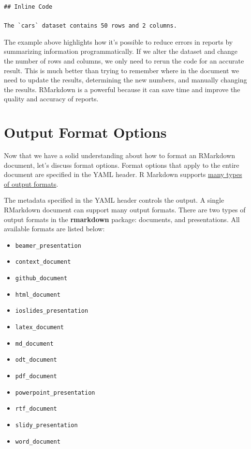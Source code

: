 \documentclass[
]{book}
\begin{document}
\begin{verbatim}
## Inline Code

The `cars` dataset contains 50 rows and 2 columns.
\end{verbatim}

The example above highlights how it's possible to reduce errors in reports by summarizing information programmatically. If we alter the dataset and change the number of rows and columns, we only need to rerun the code for an accurate result. This is much better than trying to remember where in the document we need to update the results, determining the new numbers, and manually changing the results. RMarkdown is a powerful because it can save time and improve the quality and accuracy of reports.

\hypertarget{output-format-options}{%
\section{Output Format Options}\label{output-format-options}}

Now that we have a solid understanding about how to format an RMarkdown document, let's discuss format options. Format options that apply to the entire document are specified in the YAML header. R Markdown supports \href{https://rmarkdown.rstudio.com/authoring_quick_tour.html\#Output_Formats}{many types of output formats}.

The metadata specified in the YAML header controls the output. A single RMarkdown document can support many output formats. There are two types of output formats in the \textbf{rmarkdown} package: documents, and presentations. All available formats are listed below:

\begin{itemize}
\item
  \texttt{beamer\_presentation}
\item
  \texttt{context\_document}
\item
  \texttt{github\_document}
\item
  \texttt{html\_document}
\item
  \texttt{ioslides\_presentation}
\item
  \texttt{latex\_document}
\item
  \texttt{md\_document}
\item
  \texttt{odt\_document}
\item
  \texttt{pdf\_document}
\item
  \texttt{powerpoint\_presentation}
\item
  \texttt{rtf\_document}
\item
  \texttt{slidy\_presentation}
\item
  \texttt{word\_document}
\end{itemize}
\end{document}
